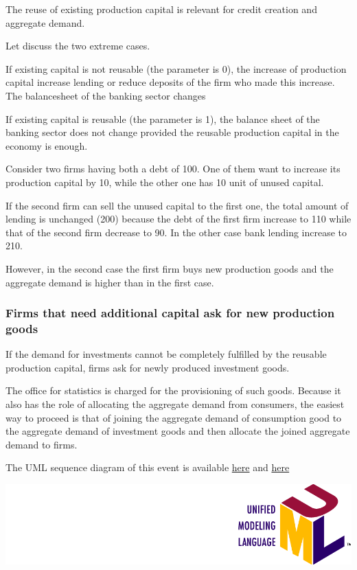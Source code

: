 \documentclass{book}
\newcommand{\umllocation}{file:///Users/giulioni/Dropbox/svn/sfcabm_my/documentation}
\begin{document}
The reuse of existing production capital is relevant for credit creation and aggregate demand.

Let discuss the two extreme cases.

If existing capital is not reusable (the parameter is 0), the increase of production capital increase lending or reduce deposits of the firm who made this increase. The balancesheet of the banking sector changes

If existing capital is reusable (the parameter is 1), the balance sheet of the banking sector does not change provided the reusable production capital in the economy is enough.

Consider two firms having both a debt of 100. One of them want to increase its production capital by 10, while the other one has 10 unit of unused capital. 

If the second firm can sell the unused capital to the first one, the total amount of lending is unchanged (200) because the debt of the first firm increase to 110 while that of the second firm decrease to 90.
In the other case bank lending increase to 210.

However, in the second case the first firm buys new production goods and the aggregate demand is higher than in the first case. 

\subsubsection{Firms that need additional capital ask for new production goods}

If the demand for investments cannot be completely fulfilled by the reusable production capital, firms ask for newly produced investment goods. 

The office for statistics is charged for the  provisioning of such goods. Because it also has the role of allocating the aggregate demand from consumers, the easiest way to proceed is that of joining the aggregate demand of consumption good to the aggregate demand of investment goods and then allocate the joined aggregate demand to firms.

\vskip3mm
The UML sequence diagram of this event is available \href{\umllocation/computeInvestments.html}{here} and \href{\umllocation/allocateInvestments.html}{here}
\begin{marginfigure}
	\includegraphics[scale=0.1]{uml.png}
\end{marginfigure}
\end{document}
